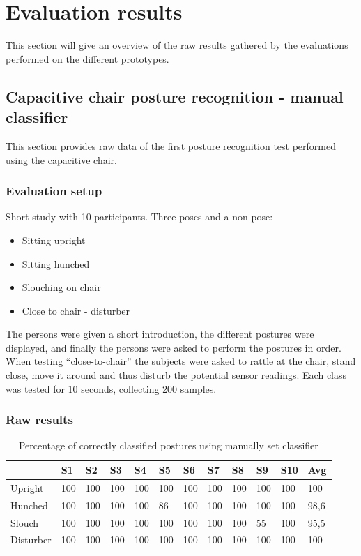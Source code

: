 \chapter{Evaluation results}
This section will give an overview of the raw results gathered by the evaluations performed on the different prototypes.
\section{Capacitive chair posture recognition - manual classifier}
This section provides raw data of the first posture recognition test performed using the capacitive chair. 
\subsection{Evaluation setup}
Short study with 10 participants. Three poses and a non-pose:
\begin{itemize}
\item Sitting upright
\item Sitting hunched
\item Slouching on chair
\item Close to chair - disturber
\end{itemize}

The persons were given a short introduction, the different postures were displayed, and finally the persons were asked to perform the postures in order. When testing “close-to-chair” the subjects were asked to rattle at the chair, stand close, move it around and thus disturb the potential sensor readings. Each class was tested for 10 seconds, collecting 200 samples. 

\subsection{Raw results}
\begin{table}[htbp]
  \centering
  \caption{Percentage of correctly classified postures using manually set classifier}
    \begin{tabularx}{\linewidth}{XXXXXXXXXXXX}
    \toprule
          & S1    & S2    & S3    & S4    & S5    & S6    & S7    & S8    & S9    & S10   & Avg \\
    \midrule
    Upright & 100   & 100   & 100   & 100   & 100   & 100   & 100   & 100   & 100   & 100   & 100 \\
    Hunched & 100   & 100   & 100   & 100   & 86    & 100   & 100   & 100   & 100   & 100   & 98,6 \\
    Slouch & 100   & 100   & 100   & 100   & 100   & 100   & 100   & 100   & 55    & 100   & 95,5 \\
    Disturber & 100   & 100   & 100   & 100   & 100   & 100   & 100   & 100   & 100   & 100   & 100 \\
    \bottomrule
    \end{tabularx}%
  \label{tab:app_eval_chair_raw1}%
\end{table}%
